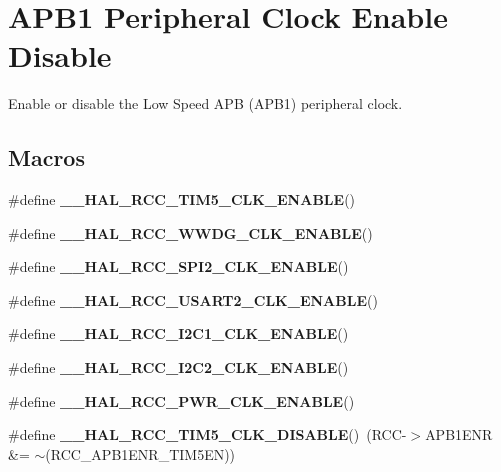 \hypertarget{group___r_c_c___a_p_b1___clock___enable___disable}{}\section{A\+P\+B1 Peripheral Clock Enable Disable}
\label{group___r_c_c___a_p_b1___clock___enable___disable}


Enable or disable the Low Speed A\+PB (A\+P\+B1) peripheral clock.  


\subsection*{Macros}
\begin{DoxyCompactItemize}
\item 
\#define {\bfseries \+\_\+\+\_\+\+H\+A\+L\+\_\+\+R\+C\+C\+\_\+\+T\+I\+M5\+\_\+\+C\+L\+K\+\_\+\+E\+N\+A\+B\+LE}()
\item 
\#define {\bfseries \+\_\+\+\_\+\+H\+A\+L\+\_\+\+R\+C\+C\+\_\+\+W\+W\+D\+G\+\_\+\+C\+L\+K\+\_\+\+E\+N\+A\+B\+LE}()
\item 
\#define {\bfseries \+\_\+\+\_\+\+H\+A\+L\+\_\+\+R\+C\+C\+\_\+\+S\+P\+I2\+\_\+\+C\+L\+K\+\_\+\+E\+N\+A\+B\+LE}()
\item 
\#define {\bfseries \+\_\+\+\_\+\+H\+A\+L\+\_\+\+R\+C\+C\+\_\+\+U\+S\+A\+R\+T2\+\_\+\+C\+L\+K\+\_\+\+E\+N\+A\+B\+LE}()
\item 
\#define {\bfseries \+\_\+\+\_\+\+H\+A\+L\+\_\+\+R\+C\+C\+\_\+\+I2\+C1\+\_\+\+C\+L\+K\+\_\+\+E\+N\+A\+B\+LE}()
\item 
\#define {\bfseries \+\_\+\+\_\+\+H\+A\+L\+\_\+\+R\+C\+C\+\_\+\+I2\+C2\+\_\+\+C\+L\+K\+\_\+\+E\+N\+A\+B\+LE}()
\item 
\#define {\bfseries \+\_\+\+\_\+\+H\+A\+L\+\_\+\+R\+C\+C\+\_\+\+P\+W\+R\+\_\+\+C\+L\+K\+\_\+\+E\+N\+A\+B\+LE}()
\item 
\mbox{\label{group___r_c_c___a_p_b1___clock___enable___disable_ga44f246a1407fadc350e416e4c3256f6e}} 
\#define {\bfseries \+\_\+\+\_\+\+H\+A\+L\+\_\+\+R\+C\+C\+\_\+\+T\+I\+M5\+\_\+\+C\+L\+K\+\_\+\+D\+I\+S\+A\+B\+LE}()~(R\+CC-\/$>$A\+P\+B1\+E\+NR \&= $\sim$(R\+C\+C\+\_\+\+A\+P\+B1\+E\+N\+R\+\_\+\+T\+I\+M5\+EN))
\item 
\mbox{\label{group___r_c_c___a_p_b1___clock___enable___disable_ga6afa0a633cf2553743a494d97aa5b997}} 

\end{DoxyCompactItemize}
